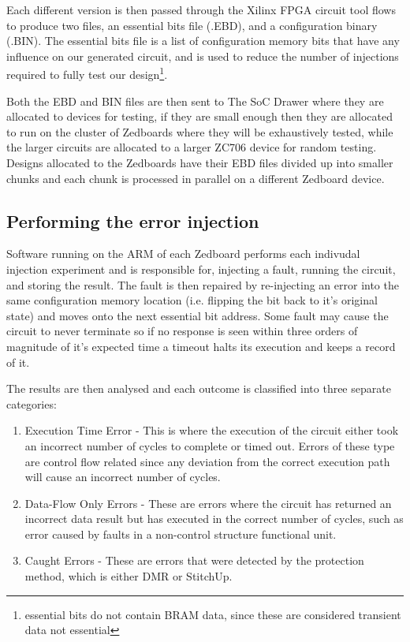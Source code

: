 Each different version is then passed through the Xilinx FPGA circuit tool flows to produce
two files, an essential bits file (.EBD), and a configuration binary (.BIN).
The essential bits file is a list of configuration memory bits that have any
influence on our generated circuit, and is used to reduce the number of injections
required to fully test our design\footnote{essential bits do not contain BRAM data, since these are considered transient data not essential}.

Both the EBD and BIN files are then sent to The SoC Drawer where they are allocated to
devices for testing, if they are small enough then they are allocated to run on the 
cluster of Zedboards where they will be exhaustively tested, while the larger circuits 
are allocated to a larger ZC706 device for random testing.
Designs allocated to the Zedboards have their EBD files divided up
into smaller chunks and each chunk is processed in parallel on a different Zedboard device.

\subsection{Performing the error injection}
Software running on the ARM of each Zedboard performs each indivudal injection experiment
and is responsible for, injecting a fault, 
running the circuit, and storing the result.
The fault is then repaired by re-injecting an error into the
same configuration memory location (i.e. flipping the bit back to it's original state)
and moves onto the next essential bit address.
Some fault may cause the circuit to never terminate so if no response is seen within three orders
of magnitude of it's expected time a timeout halts its execution and keeps a record of it.

The results are then analysed and each outcome is classified into three separate categories:

\begin{enumerate}
\setlength{\itemsep}{1pt}
\setlength{\parskip}{0pt}
\setlength{\parsep}{0pt}
\item Execution Time Error - This is where the execution of the circuit either took
an incorrect number of cycles to complete or timed out. Errors of these type are
control flow related since any deviation from the correct execution path will cause
an incorrect number of cycles.
\item Data-Flow Only Errors - These are errors where the circuit has returned an incorrect
data result but has executed in the correct number of cycles, such as error caused
by faults in a non-control structure functional unit.
\item Caught Errors - These are errors that were detected by the protection method, which is
either DMR or StitchUp.
\end{enumerate}
